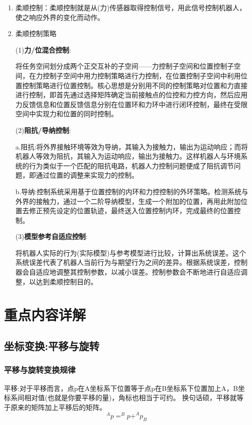 \documentclass[12pt, a4paper, oneside]{ctexbook}
\begin{document}
\begin{enumerate}
	\item 柔顺控制：柔顺控制就是从(力)传感器取得控制信号，用此信号控制机器人，使之响应外界的变化而动作。
	
	\item 柔顺控制策略
	
	(1)\textbf{力/位混合控制}:
	
	将任务空间划分成两个正交互补的子空间——力控制子空间和位置控制子空间，在力控制子空间中用力控制策略进行力控制，在位置控制子空间中利用位置控制策略进行位置控制。核心思想是分别用不同的控制策略对位置和力直接进行控制，即首先通过选择矩阵确定当前接触点的位控和力控方向，然后应用力反馈信息和位置反馈信息分别在位置环和力环中进行闭环控制，最终在受限空间中实现力和位置的同时控制。
	
	
	(2)\textbf{阻抗/导纳控制}:
	
	a.阻抗:将外界接触环境等效为导纳，其输入为接触力，输出为运动响应；而将机器人等效为阻抗，其输入为运动响应，输出为接触力。这样机器人与环境系统的行为类似于一个匹配的阻抗电路，机器人力控制问题便成了阻抗调节问题，即通过位置的调整来实现力的控制。
	
	b.导纳:控制系统采用基于位置控制的内环和力控控制的外环策略。检测系统与外界的接触力，通过一个二阶导纳模型，生成一个附加的位置，再用此附加位置去修正预先设定的位置轨迹，最终送入位置控制内环，完成最终的位置控制。
	
	(3)\textbf{模型参考自适应控制}:
	
	将机器人实际的行为(实际模型)与参考模型进行比较，计算出系统误差。这个系统误差代表了机器人当前行为与期望行为之间的差异。根据系统误差，控制器会自适应地调整其控制参数，以减小误差。控制参数会不断地进行自适应调整，以达到柔顺控制目的。
	
	
\end{enumerate}

\chapter{重点内容详解}

\section{坐标变换:平移与旋转}

\subsection{平移与旋转变换规律}
平移:对于平移而言，点p在A坐标系下位置等于点p在B坐标系下位置加上A，B坐标系间相对值(也就是你要平移的量)，角标也相当于可约。
换句话硕，平移就等于原来的矩阵加上平移后的矩阵。
$$
^{A}p=^{B}p+^{A}p_B
$$
\end{document}
